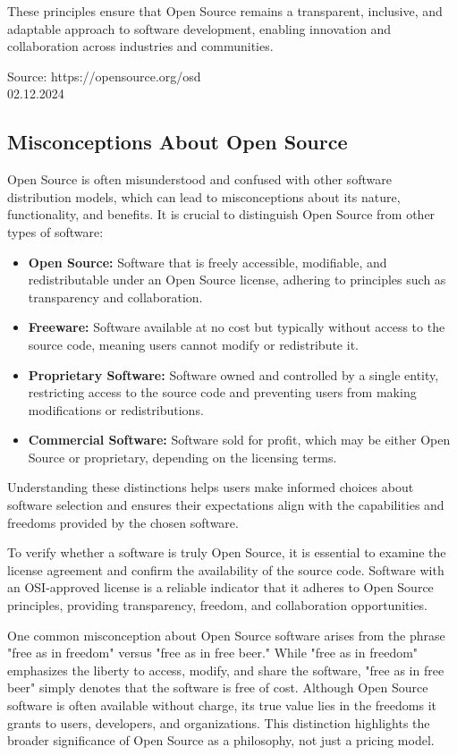 These principles ensure that Open Source remains a transparent, inclusive, and adaptable approach to software development, enabling innovation and collaboration across industries and communities.

Source: https://opensource.org/osd \\ 02.12.2024

\subsection{Misconceptions About Open Source}

Open Source is often misunderstood and confused with other software distribution models, which can lead to misconceptions about its nature, functionality, and benefits. 
It is crucial to distinguish Open Source from other types of software:

\begin{itemize}
    \item \textbf{Open Source:} Software that is freely accessible, modifiable, and redistributable under an Open Source license, adhering to principles such as transparency and collaboration.
    \item \textbf{Freeware:} Software available at no cost but typically without access to the source code, meaning users cannot modify or redistribute it.
    \item \textbf{Proprietary Software:} Software owned and controlled by a single entity, restricting access to the source code and preventing users from making modifications or redistributions.
    \item \textbf{Commercial Software:} Software sold for profit, which may be either Open Source or proprietary, depending on the licensing terms.
\end{itemize}

Understanding these distinctions helps users make informed choices about software selection and ensures their expectations align with the capabilities and freedoms provided by the chosen software.

To verify whether a software is truly Open Source, it is essential to examine the license agreement and confirm the availability of the source code. 
Software with an OSI-approved license is a reliable indicator that it adheres to Open Source principles, providing transparency, freedom, and collaboration opportunities.

One common misconception about Open Source software arises from the phrase "free as in freedom" versus "free as in free beer."  
While "free as in freedom" emphasizes the liberty to access, modify, and share the software, "free as in free beer" simply denotes that the software is free of cost. 
Although Open Source software is often available without charge, its true value lies in the freedoms it grants to users, developers, and organizations. 
This distinction highlights the broader significance of Open Source as a philosophy, not just a pricing model.


